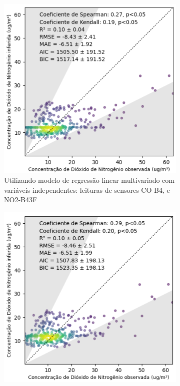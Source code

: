 \begin{figure}[h]
    \centering
    \caption{Gráfico de dispersão das leituras de múltiplos sensores e a estação de referência para medição de \acrshort{no2}}
    \begin{subfigure}{0.49\textwidth}
        \includegraphics[width=\textwidth]{chapters/4-CALIBRAÇÃO MÚLTIPLOS SENSORES/Figuras/NO2-co-no2-Multilinear-Regression.png}
        \caption{Utilizando modelo de regressão linear multivariado com variáveis independentes: leituras de sensores CO-B4, e NO2-B43F}
        \label{fig:data-co-no2-reference-NO2-corr-MLR}
    \end{subfigure}
    \hfill
    \begin{subfigure}{0.49\textwidth}
        \includegraphics[width=\textwidth]{chapters/4-CALIBRAÇÃO MÚLTIPLOS SENSORES/Figuras/NO2-co-no2-pm10-Multilinear-Regression.png}

\end{subfigure}
\end{figure}
